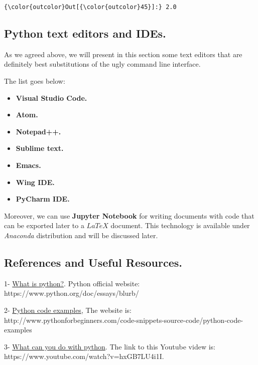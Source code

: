 \documentclass[11pt]{article}
\providecommand{\tightlist}{%
      \setlength{\itemsep}{0pt}\setlength{\parskip}{0pt}}
\begin{document}
\begin{Verbatim}[commandchars=\\\{\}]
{\color{outcolor}Out[{\color{outcolor}45}]:} 2.0
\end{Verbatim}
            
    \subsection{Python text editors and
IDEs.}\label{python-text-editors-and-ides.}

    As we agreed above, we will present in this section some text editors
that are definitely best substitutions of the ugly command line
interface.

The list goes below:

    \begin{itemize}
\tightlist
\item
  \textbf{Visual Studio Code.}
\item
  \textbf{Atom.}
\item
  \textbf{Notepad++.}
\item
  \textbf{Sublime text.}
\item
  \textbf{Emacs.}
\item
  \textbf{Wing IDE.}
\item
  \textbf{PyCharm IDE.}
\end{itemize}

    Moreover, we can use \textbf{Jupyter Notebook} for writing documents
with code that can be exported later to a \(LaTeX\) document. This
technology is available under \emph{Anaconda} distribution and will be
discussed later.

    \subsection{References and Useful
Resources.}\label{references-and-useful-resources.}

    1- \href{https://www.python.org/doc/essays/blurb/}{What is python?}.
Python official website: https://www.python.org/doc/essays/blurb/

2-
\href{http://www.pythonforbeginners.com/code-snippets-source-code/python-code-examples}{Python
code examples}, The website is:
http://www.pythonforbeginners.com/code-snippets-source-code/python-code-examples

3- \href{https://www.youtube.com/watch?v=hxGB7LU4i1I}{What can you do
with python}. The link to this Youtube videw is:
https://www.youtube.com/watch?v=hxGB7LU4i1I.
\end{document}
